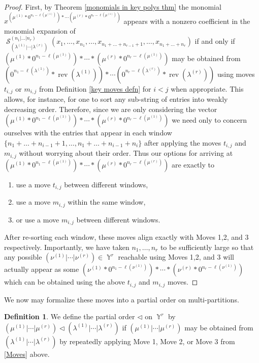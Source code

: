 \documentclass[12pt,reqno]{amsart}
\theoremstyle{definition}
\newtheorem{defn}[thm]{Definition}
\DeclareMathOperator{\Par}{\mathbb{Y}}
\DeclareMathOperator{\rev}{rev}
\DeclareMathOperator{\cS}{\mathcal{S}}
\begin{document}
\begin{proof}
    First, by Theorem \ref{monomials in key polys thm} the monomial $x^{(\mu^{(1)}*0^{n_1- \ell(\mu^{(1)})})*\cdots (\mu^{(r)}*0^{n_r- \ell(\mu^{(1)})})}$ appears with a nonzero coefficient in the monomial expansion of $\cS_{(\lambda^{(1)}|\cdots | \lambda^{(r)})}^{(n_1|\ldots|n_r)}(x_1,\ldots,x_{n_1},\ldots,x_{n_1+\ldots +n_{r-1}+1},\ldots,x_{n_1+\ldots+n_{r}})$ if and only if $(\mu^{(1)}*0^{n_1- \ell(\mu^{(1)})})*\cdots * (\mu^{(r)}*0^{n_r- \ell(\mu^{(1)})})$ may be obtained from $(0^{n_1- \ell(\lambda^{(1)})}*\rev(\lambda^{(1)}))*\cdots (0^{n_r-\ell(\lambda^{(r)})}*\rev(\lambda^{(r)}))$ using moves $t_{i,j}$ or $m_{i,j}$ from Definition \ref{key moves defn} for $i < j$ when appropriate. This allows, for instance, for one to sort any sub-string of entries into weakly decreasing order.  Therefore, since we are only considering the vector $(\mu^{(1)}*0^{n_1- \ell(\mu^{(1)})})*\cdots * (\mu^{(r)}*0^{n_r- \ell(\mu^{(1)})})$ we need only to concern ourselves with the entries that appear in each window $\{n_1+\ldots + n_{i-1}+1,\ldots, n_1+\ldots + n_{i-1}+n_i \}$ after applying the moves $t_{i,j}$ and $m_{i,j}$ without worrying about their order. Thus our options for arriving at $(\mu^{(1)}*0^{n_1- \ell(\mu^{(1)})})*\cdots * (\mu^{(r)}*0^{n_r- \ell(\mu^{(r)})})$ are exactly to 
    \begin{enumerate}
        \item use a move $t_{i,j}$ between different windows, 
        \item use a move $m_{i,j}$ within the same window, 
        \item or use a move $m_{i,j}$ between different windows.
    \end{enumerate}
    After re-sorting each window, these moves align exactly with Moves 1,2, and 3 respectively. Importantly, we have taken $n_1,\ldots, n_r$ to be sufficiently large so that any possible $(\nu^{(1)}|\cdots | \nu^{(r)}) \in \Par^r$ reachable using Moves 1,2, and 3 will actually appear as some $(\nu^{(1)}*0^{n_1- \ell(\nu^{(1)})})*\cdots * (\nu^{(r)}*0^{n_r- \ell(\nu^{(1)})})$ which can be obtained using the above $t_{i,j}$ and $m_{i,j}$ moves.
\end{proof}

We now may formalize these moves into a partial order on multi-partitions.

\begin{defn}
    We define the partial order $\triangleleft$ on $\Par^r$ by $(\mu^{(1)}|\cdots | \mu^{(r)}) \triangleleft (\lambda^{(1)}|\cdots | \lambda^{(r)})$ if $(\mu^{(1)}|\cdots | \mu^{(r)})$ may be obtained from $(\lambda^{(1)}|\cdots | \lambda^{(r)})$ by repeatedly applying Move 1, Move 2, or Move 3 from \ref{Moves} above.
\end{defn}
\end{document}
